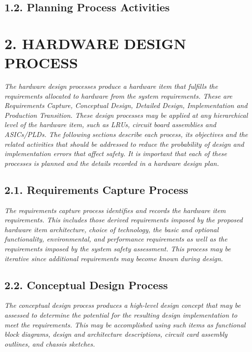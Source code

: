\documentclass[
]{article}
\begin{document}
\hypertarget{planning-process-activities}{%
\subsection{1.2. Planning Process
Activities}\label{planning-process-activities}}

\hypertarget{hardware-design-process}{%
\section{2. HARDWARE DESIGN PROCESS}\label{hardware-design-process}}

\emph{The hardware design processes produce a hardware item that
fulfills the requirements allocated to hardware from the system
requirements. These are Requirements Capture, Conceptual Design,
Detailed Design, Implementation and Production Transition. These design
processes may be applied at any hierarchical level of the hardware item,
such as LRUs, circuit board assemblies and ASICs/PLDs. The following
sections describe each process, its objectives and the related
activities that should be addressed to reduce the probability of design
and implementation errors that affect safety. It is important that each
of these processes is planned and the details recorded in a hardware
design plan.}

\hypertarget{requirements-capture-process}{%
\subsection{2.1. Requirements Capture
Process}\label{requirements-capture-process}}

\emph{The requirements capture process identifies and records the
hardware item requirements. This includes those derived requirements
imposed by the proposed hardware item architecture, choice of
technology, the basic and optional functionality, environmental, and
performance requirements as well as the requirements imposed by the
system safety assessment. This process may be iterative since additional
requirements may become known during design.}

\hypertarget{conceptual-design-process}{%
\subsection{2.2. Conceptual Design
Process}\label{conceptual-design-process}}

\emph{The conceptual design process produces a high-level design concept
that may be assessed to determine the potential for the resulting design
implementation to meet the requirements. This may be accomplished using
such items as functional block diagrams, design and architecture
descriptions, circuit card assembly outlines, and chassis sketches.}
\end{document}
